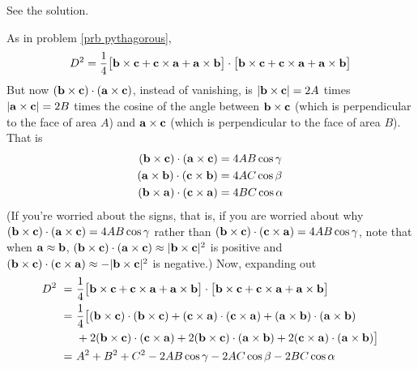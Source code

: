 \begin{answer}
See the solution.
\end{answer}

\begin{solution}
As in problem \ref{prb pythagorous},
\begin{equation*}
D^2=\frac{1}{4}
  \big[\mathbf{b}\times \mathbf{c}+\mathbf{c}\times\mathbf{a}+\mathbf{a}\times\mathbf{b}\big]\cdot
  \big[\mathbf{b}\times \mathbf{c}+\mathbf{c}\times\mathbf{a}+\mathbf{a}\times\mathbf{b}\big]
\end{equation*}
But now $(\mathbf{b}\times \mathbf{c})\cdot(\mathbf{a}\times\mathbf{c})$, instead of vanishing,
is $|\mathbf{b}\times \mathbf{c}|=2A$ times $|\mathbf{a}\times\mathbf{c}|=2B$ times
the cosine of the angle between $\mathbf{b}\times \mathbf{c}$ (which is perpendicular
to the face of area $A$) and $\mathbf{a}\times\mathbf{c}$ (which is perpendicular
to the face of area $B$). That is
\begin{align*}
(\mathbf{b}\times \mathbf{c})\cdot(\mathbf{a}\times\mathbf{c})&=4 AB\cos \gamma\\
(\mathbf{a}\times \mathbf{b})\cdot(\mathbf{c}\times\mathbf{b})&=4 AC\cos \beta\\
(\mathbf{b}\times \mathbf{a})\cdot(\mathbf{c}\times\mathbf{a})&=4 BC\cos \alpha
\end{align*}
(If you're worried about the signs, that is, if you are worried about 
why $(\mathbf{b}\times \mathbf{c})\cdot(\mathbf{a}\times\mathbf{c})=4 AB\cos \gamma$
rather than $(\mathbf{b}\times \mathbf{c})\cdot(\mathbf{c}\times\mathbf{a})=4 AB\cos \gamma$,
note  that when $\mathbf{a}\approx\mathbf{b}$, 
$(\mathbf{b}\times \mathbf{c})\cdot(\mathbf{a}\times\mathbf{c})\approx|\mathbf{b}\times\mathbf{c}|^2$ is positive and 
$(\mathbf{b}\times \mathbf{c})\cdot(\mathbf{c}\times\mathbf{a}) \approx -|\mathbf{b}\times\mathbf{c}|^2$ is negative.) Now, expanding out
\begin{align*}
D^2\ =\ &\frac{1}{4}
   \big[\mathbf{b}\times \mathbf{c}+\mathbf{c}\times\mathbf{a}+\mathbf{a}\times\mathbf{b}\big]\cdot
   \big[\mathbf{b}\times \mathbf{c}+\mathbf{c}\times\mathbf{a}+\mathbf{a}\times\mathbf{b}\big] \\
=\ &\frac{1}{4}\big[(\mathbf{b}\times \mathbf{c})\cdot(\mathbf{b}\times \mathbf{c})
     +(\mathbf{c}\times\mathbf{a})\cdot(\mathbf{c}\times\mathbf{a})
     +(\mathbf{a}\times\mathbf{b})\cdot(\mathbf{a}\times\mathbf{b}) \\
&+2(\mathbf{b}\times \mathbf{c})\cdot(\mathbf{c}\times \mathbf{a})
 +2(\mathbf{b}\times \mathbf{c})\cdot(\mathbf{a}\times \mathbf{b})
 +2(\mathbf{c}\times \mathbf{a})\cdot(\mathbf{a}\times \mathbf{b})\big] \\
=\ &A^2+B^2+C^2-2 AB\cos \gamma-2 AC\cos \beta-2 BC\cos \alpha
\end{align*}
\end{solution}




